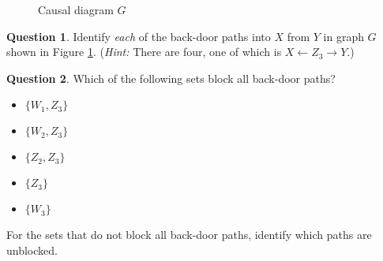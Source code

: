 \documentclass[11pt]{amsart}
\theoremstyle{definition}
\theoremstyle{question}
\newtheorem{question}{Question}
\begin{document}
\begin{figure}[h]
	\caption{Causal diagram $G$} \label{fig:causal}
    \centering
    

\end{figure}

\begin{question}
Identify \emph{each} of the back-door paths into $X$ from $Y$ in graph $G$ shown in Figure \ref{fig:causal}. (\emph{Hint:} There are four, one of which is $X \leftarrow Z_3 \rightarrow Y$.)
\end{question}

\begin{question}
Which of the following sets block all back-door paths?
	\begin{itemize}
		\item $\{ W_1, Z_3 \}$
		\item $\{ W_2, Z_3 \}$
		\item $\{ Z_2, Z_3 \}$
		\item $\{ Z_3 \}$
		\item $\{ W_3 \}$
	\end{itemize}
For the sets that do not block all back-door paths, identify which paths are unblocked.
\end{question}


\end{document}
